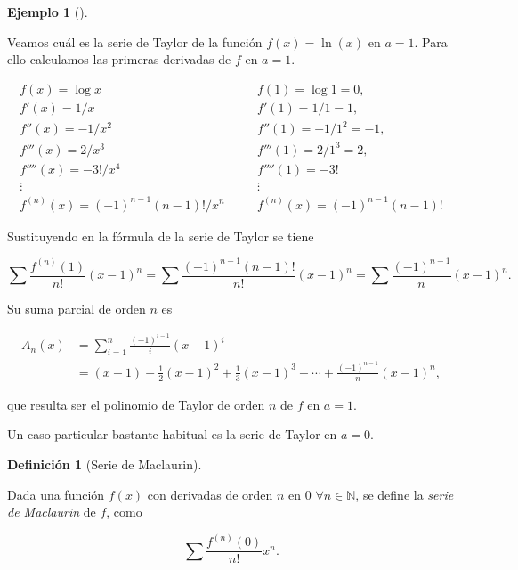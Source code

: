 \documentclass[
  a4paper,
]{scrreport}
\theoremstyle{plain}
\theoremstyle{plain}
\theoremstyle{definition}
\newtheorem{definition}{Definición}[chapter]
\theoremstyle{definition}
\newtheorem{example}{Ejemplo}[chapter]
\theoremstyle{plain}
\theoremstyle{remark}
\begin{document}
\leavevmode{}%
\begin{example}[]\label{exm-serie-taylor}

Veamos cuál es la serie de Taylor de la función \(f(x)=\ln(x)\) en
\(a=1\). Para ello calculamos las primeras derivadas de \(f\) en
\(a=1\).

\[
\begin{array}{lll}
f(x)=\log x & \quad & f(1)=\log 1 =0,\\
f'(x)=1/x & & f'(1)=1/1=1,\\
f''(x)=-1/x^2 & & f''(1)=-1/1^2=-1,\\
f'''(x)=2/x^3 & & f'''(1)=2/1^3=2,\\
f''''(x)=-3!/x^4 & & f''''(1) = -3!\\
\vdots & & \vdots\\
f^{(n)}(x) = (-1)^{n-1}(n-1)!/x^n & & f^{(n)}(x) = (-1)^{n-1}(n-1)!
\end{array}
\]

Sustituyendo en la fórmula de la serie de Taylor se tiene

\[
\sum \frac{f^{(n)}(1)}{n!}(x-1)^n = \sum \frac{(-1)^{n-1}(n-1)!}{n!} (x-1)^n = \sum \frac{(-1)^{n-1}}{n}(x-1)^n.
\]

Su suma parcial de orden \(n\) es

\begin{align*}
A_n(x) &= \sum_{i=1}^n \frac{(-1)^{i-1}}{i}(x-1)^i\\ 
&= (x-1)-\frac{1}{2}(x-1)^2 +\frac{1}{3}(x-1)^3+ \cdots +\frac{(-1)^{n-1}}{n}(x-1)^n,
\end{align*}

que resulta ser el polinomio de Taylor de orden \(n\) de \(f\) en
\(a=1\).

\end{example}

Un caso particular bastante habitual es la serie de Taylor en \(a=0\).

\leavevmode{}%
\begin{definition}[Serie de Maclaurin]\label{def-serie-maclaurin}

Dada una función \(f(x)\) con derivadas de orden \(n\) en \(0\)
\(\forall n\in\mathbb{N}\), se define la \emph{serie de Maclaurin} de
\(f\), como

\[
\sum \frac{f^{(n)}(0)}{n!}x^n.
\]

\end{definition}
\end{document}
